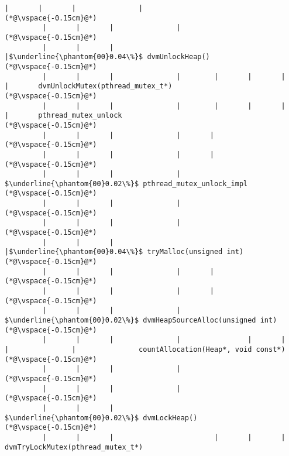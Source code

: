 \begin{lstlisting}[caption=NewDirectByteBuffer, label=profile:C2JNewDirectBuffer-512, numberbychapter=true, frame=lines, float, floatplacement=t]
         |       |       |               |
(*@\vspace{-0.15cm}@*)
         |       |       |               |
(*@\vspace{-0.15cm}@*)
         |       |       |               |$\underline{\phantom{00}0.04\%}$ dvmUnlockHeap()
(*@\vspace{-0.15cm}@*)
         |       |       |               |        |       |       |               |       dvmUnlockMutex(pthread_mutex_t*)
(*@\vspace{-0.15cm}@*)
         |       |       |               |        |       |       |               |       pthread_mutex_unlock
(*@\vspace{-0.15cm}@*)
         |       |       |               |       |
(*@\vspace{-0.15cm}@*)
         |       |       |               |       |
(*@\vspace{-0.15cm}@*)
         |       |       |               |        $\underline{\phantom{00}0.02\%}$ pthread_mutex_unlock_impl
(*@\vspace{-0.15cm}@*)
         |       |       |               |
(*@\vspace{-0.15cm}@*)
         |       |       |               |
(*@\vspace{-0.15cm}@*)
         |       |       |               |$\underline{\phantom{00}0.04\%}$ tryMalloc(unsigned int)
(*@\vspace{-0.15cm}@*)
         |       |       |               |       |
(*@\vspace{-0.15cm}@*)
         |       |       |               |       |
(*@\vspace{-0.15cm}@*)
         |       |       |               |        $\underline{\phantom{00}0.02\%}$ dvmHeapSourceAlloc(unsigned int)
(*@\vspace{-0.15cm}@*)
         |       |       |               |                |       |       |               |               countAllocation(Heap*, void const*)
(*@\vspace{-0.15cm}@*)
         |       |       |               |
(*@\vspace{-0.15cm}@*)
         |       |       |               |
(*@\vspace{-0.15cm}@*)
         |       |       |                $\underline{\phantom{00}0.02\%}$ dvmLockHeap()
(*@\vspace{-0.15cm}@*)
         |       |       |                        |       |       |                       dvmTryLockMutex(pthread_mutex_t*)

\end{lstlisting}
